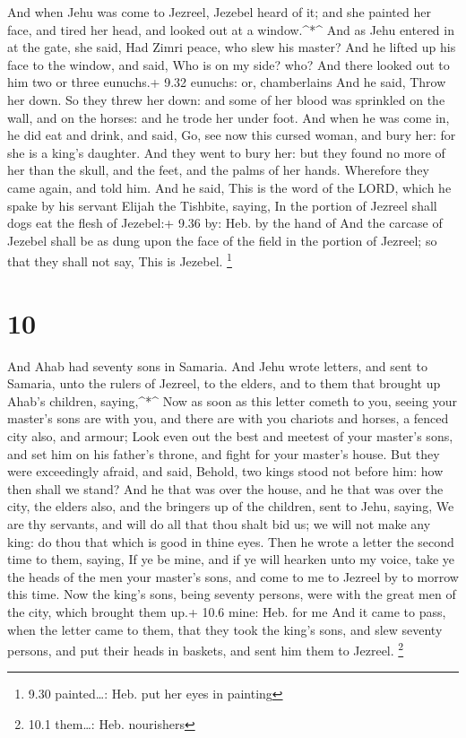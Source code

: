  And when Jehu was come to Jezreel, Jezebel heard of it;
and she painted her face, and tired her head, and looked out at a
window.\^{}*\^{}  And as Jehu entered in at the gate, she
said, Had Zimri peace, who slew his master?  And he lifted
up his face to the window, and said, Who is on my side? who? And there
looked out to him two or three eunuchs.+ 9.32 eunuchs: or, chamberlains
 And he said, Throw her down. So they threw her down: and
some of her blood was sprinkled on the wall, and on the horses: and he
trode her under foot.  And when he was come in, he did eat
and drink, and said, Go, see now this cursed woman, and bury her: for
she is a king's daughter.  And they went to bury her: but
they found no more of her than the skull, and the feet, and the palms of
her hands.  Wherefore they came again, and told him. And he
said, This is the word of the LORD, which he spake by his servant Elijah
the Tishbite, saying, In the portion of Jezreel shall dogs eat the flesh
of Jezebel:+ 9.36 by: Heb. by the hand of  And the carcase
of Jezebel shall be as dung upon the face of the field in the portion of
Jezreel; so that they shall not say, This is Jezebel. \footnote{9.30
  painted\ldots: Heb. put her eyes in painting}

\hypertarget{section-9}{%
\section{10}\label{section-9}}

 And Ahab had seventy sons in Samaria. And Jehu wrote
letters, and sent to Samaria, unto the rulers of Jezreel, to the elders,
and to them that brought up Ahab's children, saying,\^{}*\^{}
 Now as soon as this letter cometh to you, seeing your
master's sons are with you, and there are with you chariots and horses,
a fenced city also, and armour;  Look even out the best and
meetest of your master's sons, and set him on his father's throne, and
fight for your master's house.  But they were exceedingly
afraid, and said, Behold, two kings stood not before him: how then shall
we stand?  And he that was over the house, and he that was
over the city, the elders also, and the bringers up of the children,
sent to Jehu, saying, We are thy servants, and will do all that thou
shalt bid us; we will not make any king: do thou that which is good in
thine eyes.  Then he wrote a letter the second time to them,
saying, If ye be mine, and if ye will hearken unto my voice, take ye the
heads of the men your master's sons, and come to me to Jezreel by to
morrow this time. Now the king's sons, being seventy persons, were with
the great men of the city, which brought them up.+ 10.6 mine: Heb. for
me  And it came to pass, when the letter came to them, that
they took the king's sons, and slew seventy persons, and put their heads
in baskets, and sent him them to Jezreel. \footnote{10.1 them\ldots:
  Heb. nourishers}


